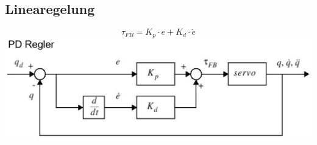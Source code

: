 \begin{minipage}{0.5\linewidth}
    \subsection{Linearegelung}
    \vspace{-1cm}
    \[ \tau_{FB}=K_p\cdot e + K_d\cdot \dot{e} \]
    \includegraphics[width=\linewidth]{./bilder/PDRegler}
\end{minipage}
\clearpage

